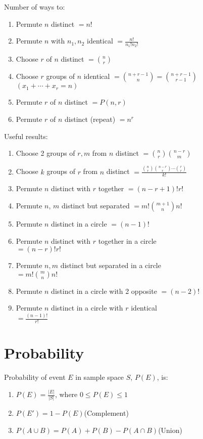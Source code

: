 \documentclass[12pt, a4paper]{article}
\begin{document}
\begin{multicols*}{3}
Number of ways to:
\begin{enumerate}[\roman*.]
  \item Permute $n$ distinct $= n!$
  \item Permute $n$ with $n_1, n_2$ identical $= \frac{n!}{n_1!n_2!}$
  \item Choose $r$ of $n$ distinct $= \binom nr$
  \item Choose $r$ groups of $n$ identical $= \binom{n+r-1}n = \binom{n+r-1}{r-1}$\\
    $(x_1+\cdots+x_r=n)$
  \item Permute $r$ of $n$ distinct $= P(n,r)$
  \item Permute $r$ of $n$ distinct (repeat) $= n^r$
\end{enumerate}
Useful results:
\begin{enumerate}[\roman*.]
  \item Choose 2 groups of $r,m$ from $n$ distinct $= \binom nr \binom {n-r}m$
  \item Choose $k$ groups of $r$ from $n$ distinct $= \frac{\binom nr \binom{n-r}r \cdots \binom rr}{k!}$
  \item Permute $n$ distinct with $r$ together $= (n-r+1)!r!$ 
  \item Permute $n$, $m$ distinct but separated $= m! \binom{m+1}n n!$ 
  \item Permute $n$ distinct in a circle $= (n-1)!$
  \item Permute $n$ distinct with $r$ together in a circle\\$= (n-r)!r!$
  \item Permute $n, m$ distinct but separated in a circle \\$= m! \binom mn n!$
  \item Permute $n$ distinct in a circle with 2 opposite $= (n-2)!$
  \item Permute $n$ distinct in a circle with $r$ identical\\$=\frac{(n-1)!}{r!}$
\end{enumerate}

\colbreak
\section{Probability}
Probability of event $E$ in sample space $S$, $P(E)$, is:
\begin{enumerate}[\roman*.]
  \item $P(E) = \displaystyle \frac{|E|}{|S|}$, where $0 \leq P(E) \leq 1$
  \item $P(E') = 1 - P(E)$\hfill(Complement)
  \item $P(A\cup B) = P(A) + P(B)- P(A\cap B)$\hfill(Union)
\end{enumerate}


\end{multicols*}
\end{document}
